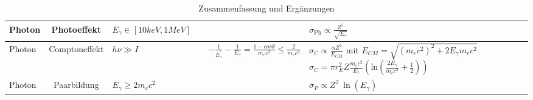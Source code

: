 \documentclass[Ex4_Zusammenfassung.tex]{subfiles}
\begin{document}
\begin{table}
\begin{tabular} {p{1.6cm} | c | p{3.5cm} | p{4cm} | p{5cm} | p{5.5cm} }
              Photon & Photoeffekt & $E_{\gamma} \in [10 keV,1 MeV] $ & & & $ \sigma_{\text{Ph}} \propto \frac{Z^5}{\sqrt{E_{\gamma}}} $ \\ 
              \hline
              
              Photon & Comptoneffekt & $h \nu \gg I$ & & $ - \frac{1}{E_{\gamma}^{'}} - \frac{1}{E_{\gamma}} = \frac{1 - cos \theta}{m_e c^2}  \leq \frac{2}{m_e c^2} $ & $ \sigma_{C} \propto \frac{\alpha Z^2}{E_{CM}} $ 
             \newline \newline mit  \newline $ E_{CM} = \sqrt{(m_e c^2)^2 + 2 E_{\gamma} m_e c^2} $ \newline \newline $ \sigma_{C} = \pi r_E^2 Z \frac{m_e c^2}{E_{\gamma}} \left( \text{ln}  \left(\frac{2 E_{\gamma}}{m_e c^2}  + \frac{1}{2} \right) \right)$ \\ 
              \hline
              
              Photon & Paarbildung & $ E_{\gamma} \geq 2 m_e c^2$ & & & $ \sigma_{P} \propto Z^2 \  \ln (E_{\gamma}) $ \\
           \bottomrule
        \end{tabular}\hspace*{-1cm}
        \caption{Zusammenfassung und Ergänzungen}
\end{table}
\end{document}
